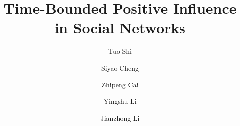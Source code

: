 %
%
%
%
%
%
\RequirePackage{fix-cm}
%
\documentclass{svjour3}                     %
%
\smartqed  %
%
\usepackage{graphicx}
%
%
\usepackage{algorithm}
\usepackage{algorithmicx}
\usepackage{algpseudocode}
\usepackage{amssymb, amsmath}
\usepackage{footmisc}
\usepackage{graphicx}
\usepackage{subfigure}
\usepackage{indentfirst}
%
%

\title{Time-Bounded Positive Influence in Social Networks
}


\author{Tuo Shi         \and
        Siyao Cheng \and
        Zhipeng Cai \and
        Yingshu Li \and
        Jianzhong Li %
}

